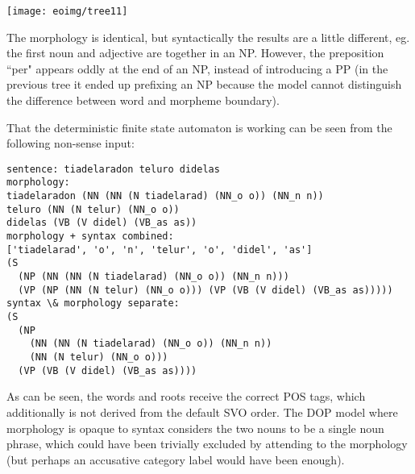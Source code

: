 \documentclass[10pt,a4paper]{article}
\begin{document}
\texttt{[image: eoimg/tree11]}

The morphology is identical, but syntactically the results are a little
different, eg. the first noun and adjective are together in an NP. However,
the preposition ``per" appears oddly at the end of an NP, instead of
introducing a PP (in the previous tree it ended up prefixing an NP because the
model cannot distinguish the difference between word and morpheme boundary).

That the deterministic finite state automaton is working can be seen from
the following non-sense input:

\begin{verbatim}
sentence: tiadelaradon teluro didelas
morphology:
tiadelaradon (NN (NN (N tiadelarad) (NN_o o)) (NN_n n))
teluro (NN (N telur) (NN_o o))
didelas (VB (V didel) (VB_as as))
morphology + syntax combined:
['tiadelarad', 'o', 'n', 'telur', 'o', 'didel', 'as']
(S
  (NP (NN (NN (N tiadelarad) (NN_o o)) (NN_n n)))
  (VP (NP (NN (N telur) (NN_o o))) (VP (VB (V didel) (VB_as as)))))
syntax \& morphology separate:
(S
  (NP
    (NN (NN (N tiadelarad) (NN_o o)) (NN_n n))
    (NN (N telur) (NN_o o)))
  (VP (VB (V didel) (VB_as as))))
\end{verbatim}

As can be seen, the words and roots receive the correct POS tags, which
additionally is not derived from the default SVO order.
The DOP model where morphology is opaque to syntax considers the two nouns
to be a single noun phrase, which could have been trivially excluded by
attending to the morphology (but perhaps an accusative category label would
have been enough).
\end{document}
